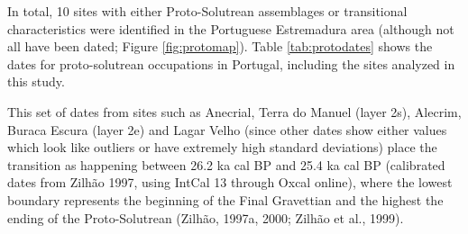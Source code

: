 \documentclass[12pt,twoside]{reedthesis}
\begin{document}
In total, 10 sites with either Proto-Solutrean assemblages or transitional characteristics were identified in the Portuguese Estremadura area (although not all have been dated; Figure \ref{fig:protomap}). Table \ref{tab:protodates} shows the dates for proto-solutrean occupations in Portugal, including the sites analyzed in this study.

This set of dates from sites such as Anecrial, Terra do Manuel (layer 2s), Alecrim, Buraca Escura (layer 2e) and Lagar Velho (since other dates show either values which look like outliers or have extremely high standard deviations) place the transition as happening between 26.2 ka cal BP and 25.4 ka cal BP (calibrated dates from Zilhão 1997, using IntCal 13 through Oxcal online), where the lowest boundary represents the beginning of the Final Gravettian and the highest the ending of the Proto-Solutrean (Zilhão, 1997a, 2000; Zilhão et al., 1999).
\end{document}
